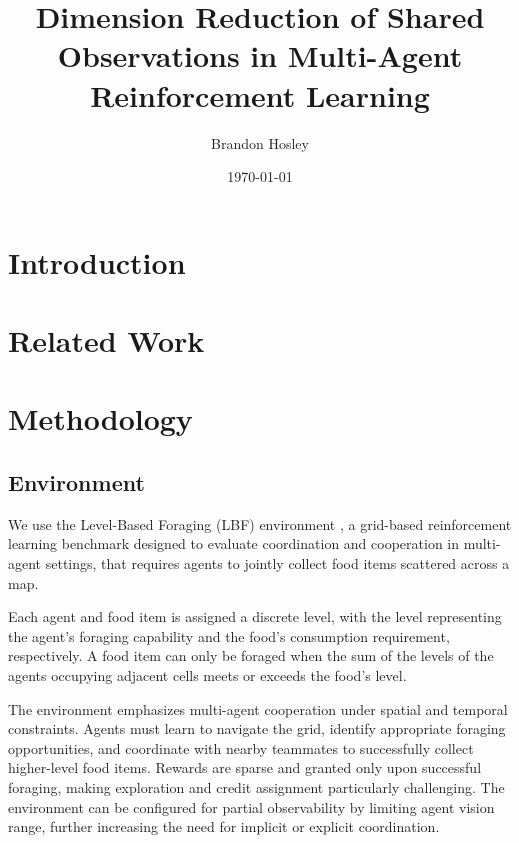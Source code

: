 \documentclass{article}
\title{Dimension Reduction of Shared Observations in Multi-Agent Reinforcement Learning}
\author{Brandon Hosley}
\date{\today}
\begin{document}
\maketitle

\begin{abstract}
\end{abstract}

\section{Introduction}


\section{Related Work}

\cite{busoniu2008} %


\section{Methodology}




\subsection{Environment}

We use the Level-Based Foraging (LBF) environment \cite{papoudakis2021},
a grid-based reinforcement learning benchmark designed to evaluate 
coordination and cooperation in multi-agent settings,
that requires agents to jointly collect food items scattered across a map. 

Each agent and food item is assigned a discrete level, with the level representing 
the agent's foraging capability and the food's consumption requirement, respectively.
A food item can only be foraged when the sum of the levels of the agents 
occupying adjacent cells meets or exceeds the food's level.

The environment emphasizes multi-agent cooperation under spatial and temporal constraints. 
Agents must learn to navigate the grid, identify appropriate foraging opportunities, 
and coordinate with nearby teammates to successfully collect higher-level food items. 
Rewards are sparse and granted only upon successful foraging, 
making exploration and credit assignment particularly challenging. 
The environment can be configured for partial observability by limiting agent vision range, 
further increasing the need for implicit or explicit coordination.
\end{document}
